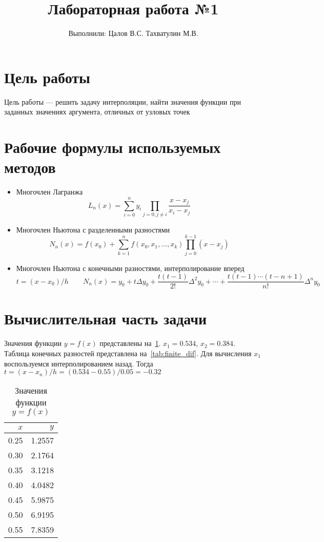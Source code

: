 \documentclass{article}
\title{Лабораторная работа №1}
\author{Выполнили: Цалов В.С. Тахватулин М.В.}
\begin{document}
\section{Цель работы}
Цель работы --- решить задачу интерполяции, найти значения функции при
заданных значениях аргумента, отличных от узловых точек
\section{Рабочие формулы используемых методов}
\begin{itemize}
  \item Многочлен Лагранжа
    \[ L_n(x) = \sum_{i = 0}^n y_i \prod_{j=0; j \neq i} \frac{x - x_j}{x_i - x_j} \]
  \item Многочлен Ньютона с разделенными разностями
    \[ 
    N_n(x) = f(x_0) + \sum_{k = 1}^n f(x_0, x_1, \ldots, x_k)
    \prod_{j=0}^{k-1} (x - x_j)
    \]
  \item Многочлен Ньютона с конечными разностями, интерполирование вперед
    \[
      t = (x - x_0) / h \qquad
    N_n(x) = y_0 + t \Delta y_0 + \frac{t(t-1)}{2!} \Delta^2 y_0
    + \cdots + \frac{t(t-1)\cdots(t-n+1)}{n!} \Delta^n y_0
    \]
\end{itemize}

\section{Вычислительная часть задачи}
Значения функции \(y = f(x)\) представлены на~\cref{tab:function}.
\(x_1 = 0.534\), \(x_2 = 0.384\).
Таблица конечных разностей представлена на~\cref{tab:finite_dif}.
Для вычисления \(x_1\) воспользуемся интерполированием назад.
Тогда \( t = (x - x_n) / h = (0.534 - 0.55) / 0.05 = -0.32 \)
\begin{table}
  \caption{Значения функции \(y = f(x)\)}\label{tab:function}
  \centering
  \begin{tabular}{rr}
    \toprule
    \(x\) & \(y\) \\
    \midrule
    0.25 & 1.2557 \\
    0.30 & 2.1764 \\
    0.35 & 3.1218 \\
    0.40 & 4.0482 \\
    0.45 & 5.9875 \\
    0.50 & 6.9195 \\
    0.55 & 7.8359 \\
    \bottomrule
  \end{tabular}
\end{table}
\end{document}
